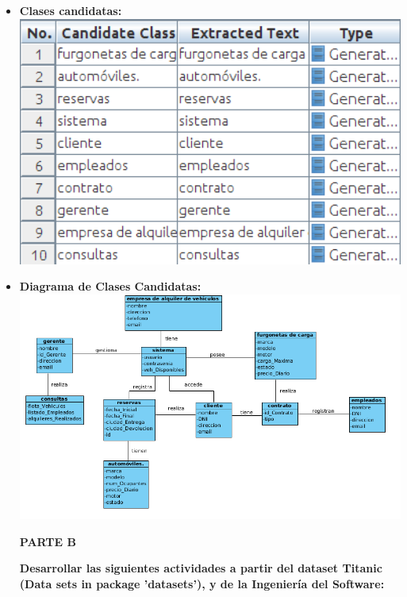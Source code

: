 \documentclass{article}
\begin{document}
{\begin{flushleft}
\begin{itemize}
\item\textbf {Clases candidatas: }\\
\includegraphics[width=14cm]{img/CLASESB} \hspace{0.5cm}
\newpage
\item\textbf {Diagrama de Clases Candidatas: }\\
\includegraphics[width=18cm]{img/parteBmodelo} \hspace{0.5cm}\\
\begin{center}
\textbf {PARTE B}
\end{center}
\textbf{Desarrollar las siguientes actividades a partir del dataset Titanic (Data sets in package 'datasets'), y de la Ingeniería del Software:}\par


\end{itemize}
\end{flushleft}}
\end{document}
